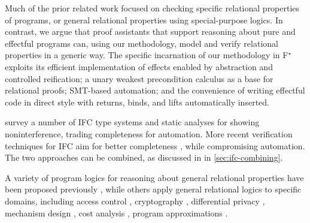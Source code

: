 \documentclass[sigplan,screen]{acmart}\settopmatter{}
\newcommand\fstar{F$^\star$\xspace}
\newcommand*{\EG}{e.g.,\xspace}
\begin{document}

Much of the prior related work focused on checking specific relational
properties of programs, or general relational properties using
special-purpose logics.
%
In contrast, we argue that proof assistants that support reasoning
about pure and effectful programs can, using our methodology, model
and verify relational properties in a generic way.
%
The specific incarnation of our methodology in \fstar exploits its
efficient implementation of effects enabled by abstraction and
controlled reification; a unary weakest precondition calculus as a
base for relational proofs; SMT-based automation; and the convenience
of writing effectful code in direct style with returns, binds, and
lifts automatically inserted.


%
\citet{SabelfeldM03} survey a number of IFC type systems and
static analyses for showing noninterference, trading completeness for
automation.
%
More recent verification techniques for IFC aim for better
completeness \cite{BeringerH07, NanevskiBG13, AmtoftB04, AmtoftDZABHOC12,
BanerjeeNN16, SchebenS11, BartheFGSSB14, Rabe16}, while compromising
automation.
%
The two approaches can be combined, as discussed in
in \autoref{sec:ifc-combining}.

A variety of program logics for reasoning about general relational
properties have been proposed previously \citep{benton04relational,
Yang07, BartheGB09, AguirreBGGS17}, while others apply general
relational logics to specific domains, including access
control \cite{NanevskiBG13}, cryptography \cite{BartheGB12,
BartheGB09, BartheDGKSS13, PetcherM15}, differential
privacy \cite{BartheKOB13, ZhangK17}, mechanism
design \cite{BartheGAHRS15}, cost analysis \cite{CicekBG0H17}, program
approximations \cite{CarbinKMR12}.
\end{document}
